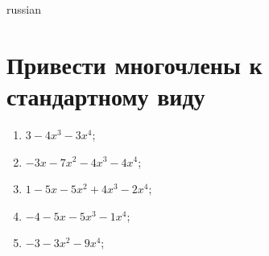 \documentclass[a4paper]{article}
\begin{document}
\begin{otherlanguage*}{russian}

\section{Привести многочлены к стандартному виду}
\begin{enumerate}
\item $3-4x^3-3x^4$;
\item $-3x-7x^2-4x^3-4x^4$;
\item $1-5x-5x^2 + 4x^3-2x^4$;
\item $-4-5x-5x^3-1x^4$;
\item $-3-3x^2-9x^4$;
\end{enumerate}
\end{otherlanguage*}
\end{document}

